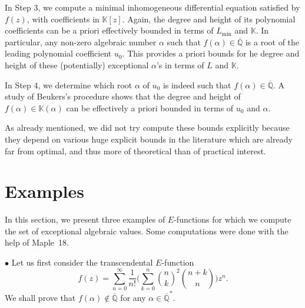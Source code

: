 \documentclass[reqno,english,12pt,a4paper]{smfart}
\numberwithin{equation}{section}
\def\Qbar{\overline{\mathbb Q}}
\def\K{\mathbb K}
\begin{document}
In Step 3, we compute a minimal inhomogeneous differential equation  satisfied by $f(z)$, with coefficients in $\K[z]$. Again, the degree and height  of its polynomial coefficients can be a priori effectively bounded in terms of $L_{\min}$ and $\K$. In particular, any non-zero 
algebraic number $\alpha$ such that $f(\alpha)\in \Qbar$ is a root of the leading polynomial coefficient $u_0$. This provides a priori bounds for he  degree and height of these (potentially) exceptional $\alpha$'s in terms of $L$ and $\K$.

In Step 4, we determine which root $\alpha$ of $u_0$ is indeed such that $f(\alpha)\in \Qbar$. A study of Beukers's procedure shows that the degree and height of $f(\alpha)\in \K(\alpha)$ can be effectively a priori bounded in terms of $u_0$ and $\alpha$. 

As already mentioned, we did not try compute these bounds explicitly because they depend on various huge explicit bounds in the literature which are already far from optimal, and thus more of theoretical than of practical interest.


\section{Examples}\label{sec:ex}

In this section, we present three examples of $E$-functions for which we compute the set of exceptional algebraic values. 
Some computations were done with the help of Maple~18.

\medskip

$\bullet$ Let us first consider the transcendental $E$-function
$$
f(z)= \sum_{n=0}^\infty \frac{1}{n!}\bigg(\sum_{k=0}^n\binom{n}{k}^2\binom{n+k}{n}\bigg) z^n.
$$
We shall prove that $f(\alpha)\notin \Qbar$ for any $\alpha\in \Qbar^*$.
\end{document}
